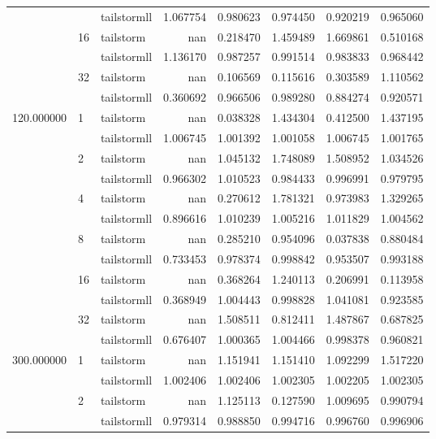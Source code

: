 \begin{tabular}{lllrrrrr}
 &  & tailstormll & 1.067754 & 0.980623 & 0.974450 & 0.920219 & 0.965060 \\
 & \multirow[c]{2}{*}{16} & tailstorm & nan & 0.218470 & 1.459489 & 1.669861 & 0.510168 \\
 &  & tailstormll & 1.136170 & 0.987257 & 0.991514 & 0.983833 & 0.968442 \\
 & \multirow[c]{2}{*}{32} & tailstorm & nan & 0.106569 & 0.115616 & 0.303589 & 1.110562 \\
 &  & tailstormll & 0.360692 & 0.966506 & 0.989280 & 0.884274 & 0.920571 \\
\multirow[c]{12}{*}{120.000000} & \multirow[c]{2}{*}{1} & tailstorm & nan & 0.038328 & 1.434304 & 0.412500 & 1.437195 \\
 &  & tailstormll & 1.006745 & 1.001392 & 1.001058 & 1.006745 & 1.001765 \\
 & \multirow[c]{2}{*}{2} & tailstorm & nan & 1.045132 & 1.748089 & 1.508952 & 1.034526 \\
 &  & tailstormll & 0.966302 & 1.010523 & 0.984433 & 0.996991 & 0.979795 \\
 & \multirow[c]{2}{*}{4} & tailstorm & nan & 0.270612 & 1.781321 & 0.973983 & 1.329265 \\
 &  & tailstormll & 0.896616 & 1.010239 & 1.005216 & 1.011829 & 1.004562 \\
 & \multirow[c]{2}{*}{8} & tailstorm & nan & 0.285210 & 0.954096 & 0.037838 & 0.880484 \\
 &  & tailstormll & 0.733453 & 0.978374 & 0.998842 & 0.953507 & 0.993188 \\
 & \multirow[c]{2}{*}{16} & tailstorm & nan & 0.368264 & 1.240113 & 0.206991 & 0.113958 \\
 &  & tailstormll & 0.368949 & 1.004443 & 0.998828 & 1.041081 & 0.923585 \\
 & \multirow[c]{2}{*}{32} & tailstorm & nan & 1.508511 & 0.812411 & 1.487867 & 0.687825 \\
 &  & tailstormll & 0.676407 & 1.000365 & 1.004466 & 0.998378 & 0.960821 \\
\multirow[c]{12}{*}{300.000000} & \multirow[c]{2}{*}{1} & tailstorm & nan & 1.151941 & 1.151410 & 1.092299 & 1.517220 \\
 &  & tailstormll & 1.002406 & 1.002406 & 1.002305 & 1.002205 & 1.002305 \\
 & \multirow[c]{2}{*}{2} & tailstorm & nan & 1.125113 & 0.127590 & 1.009695 & 0.990794 \\
 &  & tailstormll & 0.979314 & 0.988850 & 0.994716 & 0.996760 & 0.996906 \\

\end{tabular}
